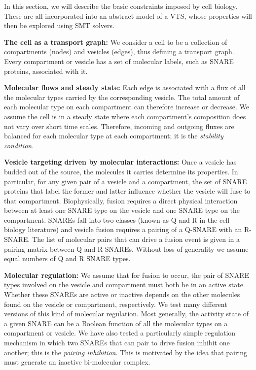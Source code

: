 
In this section, we will describe the basic constraints imposed by cell biology. These are all incorporated into an abstract model of a VTS, whose properties will then be explored using SMT solvers.

\textbf{The cell as a transport graph:} We consider a cell to be a collection of compartments (nodes) and vesicles (edges), thus defining a transport graph. Every compartment or vesicle has a set of molecular labels, such as SNARE proteins, associated with it.

\textbf{Molecular flows and steady state:} Each edge is associated with a flux of all the molecular types carried by the corresponding vesicle. The total amount of each molecular type on each compartment can therefore increase or decrease. We assume the cell is in a steady state where each compartment’s composition does not vary over short time scales. Therefore, incoming and outgoing fluxes are balanced for each molecular type at each compartment; it is the \textit{stability condition}.

\textbf{Vesicle targeting driven by molecular interactions:} Once a vesicle has budded out of the source, the molecules it carries determine its properties. In particular, for any given pair of a vesicle and a compartment, the set of SNARE proteins that label the former and latter influence whether the vesicle will fuse to that compartment. Biophysically, fusion requires a direct physical interaction between at least one SNARE type on the vesicle and one SNARE type on the compartment. SNAREs fall into two classes (known as Q and R in the cell biology literature) and vesicle fusion requires a pairing of a Q-SNARE with an R-SNARE. The list of molecular pairs that can drive a fusion event is given in a pairing matrix between Q and R SNAREs. Without loss of generality we assume equal numbers of Q and R SNARE types.

\textbf{Molecular regulation:} We assume that for fusion to occur, the pair of SNARE types involved on the vesicle and compartment must both be in an active state. Whether these SNAREs are active or inactive depends on the other molecules found on the vesicle or compartment, respectively. We test many different versions of this kind of molecular regulation. Most generally, the activity state of a given SNARE can be a Boolean function of all the molecular types on a compartment or vesicle. We have also tested \cite{shukla} a particularly simple regulation mechanism in which two SNAREs that can pair to drive fusion inhibit one another; this is the \textit{pairing inhibition}. This is motivated by the idea that pairing must generate an inactive bi-molecular complex.

